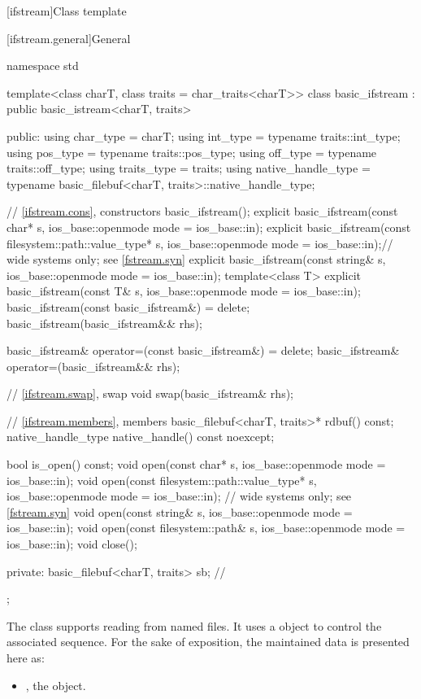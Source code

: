 [ifstream]{Class template }

[ifstream.general]{General}

%
\begin{codeblock}
namespace std {
  template<class charT, class traits = char_traits<charT>>
  class basic_ifstream : public basic_istream<charT, traits> {
  public:
    using char_type   = charT;
    using int_type    = typename traits::int_type;
    using pos_type    = typename traits::pos_type;
    using off_type    = typename traits::off_type;
    using traits_type = traits;
    using native_handle_type = typename basic_filebuf<charT, traits>::native_handle_type;

    // \ref{ifstream.cons}, constructors
    basic_ifstream();
    explicit basic_ifstream(const char* s,
                            ios_base::openmode mode = ios_base::in);
    explicit basic_ifstream(const filesystem::path::value_type* s,
                            ios_base::openmode mode = ios_base::in);// wide systems only; see \ref{fstream.syn}
    explicit basic_ifstream(const string& s,
                            ios_base::openmode mode = ios_base::in);
    template<class T>
      explicit basic_ifstream(const T& s, ios_base::openmode mode = ios_base::in);
    basic_ifstream(const basic_ifstream&) = delete;
    basic_ifstream(basic_ifstream&& rhs);

    basic_ifstream& operator=(const basic_ifstream&) = delete;
    basic_ifstream& operator=(basic_ifstream&& rhs);

    // \ref{ifstream.swap}, swap
    void swap(basic_ifstream& rhs);

    // \ref{ifstream.members}, members
    basic_filebuf<charT, traits>* rdbuf() const;
    native_handle_type native_handle() const noexcept;

    bool is_open() const;
    void open(const char* s, ios_base::openmode mode = ios_base::in);
    void open(const filesystem::path::value_type* s,
              ios_base::openmode mode = ios_base::in);  // wide systems only; see \ref{fstream.syn}
    void open(const string& s, ios_base::openmode mode = ios_base::in);
    void open(const filesystem::path& s, ios_base::openmode mode = ios_base::in);
    void close();

  private:
    basic_filebuf<charT, traits> sb;    // \expos
  };
}
\end{codeblock}

\pnum
The class
supports reading from named files.
It uses a
object to control the associated
sequence.
For the sake of exposition, the maintained data is presented here as:
\begin{itemize}
\item
{}, the  object.
\end{itemize}

